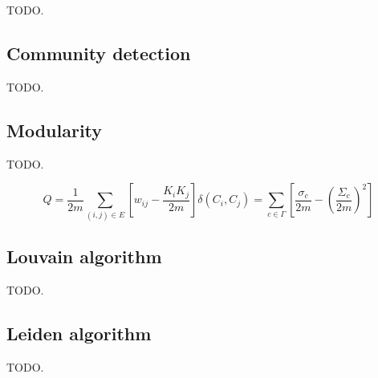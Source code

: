 TODO.




\subsection{Community detection}

TODO.




\subsection{Modularity}

TODO.

\begin{equation}
\label{eq:modularity}
  Q
  = \frac{1}{2m} \sum_{(i, j) \in E} \left[w_{ij} - \frac{K_i K_j}{2m}\right] \delta(C_i, C_j)
  = \sum_{c \in \Gamma} \left[\frac{\sigma_c}{2m} - \left(\frac{\Sigma_c}{2m}\right)^2\right]
\end{equation}





\subsection{Louvain algorithm}
\label{sec:about-louvain}

TODO.




\subsection{Leiden algorithm}
\label{sec:about-leiden}

TODO.
